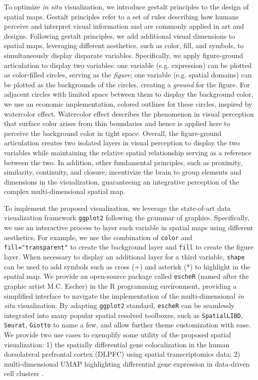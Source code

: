 \documentclass[11pt]{article}
\begin{document}
 To optimize \textit{in situ} visualization, we introduce gestalt principles to the design of spatial maps. Gestalt principles\cite{todorovic_2008, palmer_1999} refer to a set of rules describing how humans perceive and interpret visual information and are commonly applied in art and designs. Following gestalt principles, we add additional visual dimensions to spatial maps, leveraging different aesthetics, such as color, fill, and symbols, to simultaneously display disparate variables. Specifically, we apply figure-ground articulation to display two variables: one variable (e.g. expression) can be plotted as color-filled circles, serving as the \textit{figure}; one variable (e.g. spatial domains) can be plotted as the backgrounds of the circles, creating a \textit{ground} for the figure. For adjacent circles with limited space between them to display the background color, we use an economic implementation, colored outlines for these circles, inspired by watercolor effect\cite{pinna_1987, pinna_2001}. Watercolor effect describes the phenomenon in visual perception that surface color arises from thin boundaries and hence is applied here to perceive the background color in tight space. Overall, the figure-ground articulation creates two isolated layers in visual perception to display the two variables while maintaining the relative spatial relationship serving as a reference between the two. In addition, other fundamental principles\cite{todorovic_2008}, such as proximity, similarity, continuity, and closure, incentivize the brain to group elements and dimensions in the visualization, guaranteeing an integrative perception of the complex multi-dimensional spatial map.
 

To implement the proposed visualization, we leverage the state-of-art data visualization framework \texttt{ggplot2}\cite{ggplot2} following the grammar of graphics\cite{wilkinson_2012}. Specifically, we use an interactive process to layer each variable in spatial maps using different aesthetics. For example, we use the combination of \texttt{color} and \texttt{fill="transparent"} to create the background layer and \texttt{fill} to create the figure layer. When necessary to display an additional layer for a third variable, \texttt{shape} can be used to add symbols such as cross (+) and asterisk (*) to highlight in the spatial map. We provide an open-source package called \texttt{escheR} (named after the graphic artist M.C. Escher) in the R programming environment\cite{R}, providing a simplified interface to navigate the implementation of the multi-dimensional \textit{in situ} visualization. By adapting \texttt{ggplot2} standard, \texttt{escheR} can be seamlessly integrated into many popular spatial resolved toolboxes, such as \texttt{SpatialLIBD}\cite{pardo_2022}, \texttt{Seurat}\cite{hao_2021}, \texttt{Giotto}\cite{dries_2021} to name a few, and allow further theme customization with ease. We provide two use cases to exemplify some utility of the proposed spatial visualization: 1) the spatially differential gene colocalization in the human dorsolateral prefrontal cortex (DLPFC) using spatial transcriptomics data\cite{huukimyers_2023}; 2) multi-dimensional UMAP highlighting differential gene expression in data-driven cell clusters \cite{freytag_2020}. 
\end{document}
